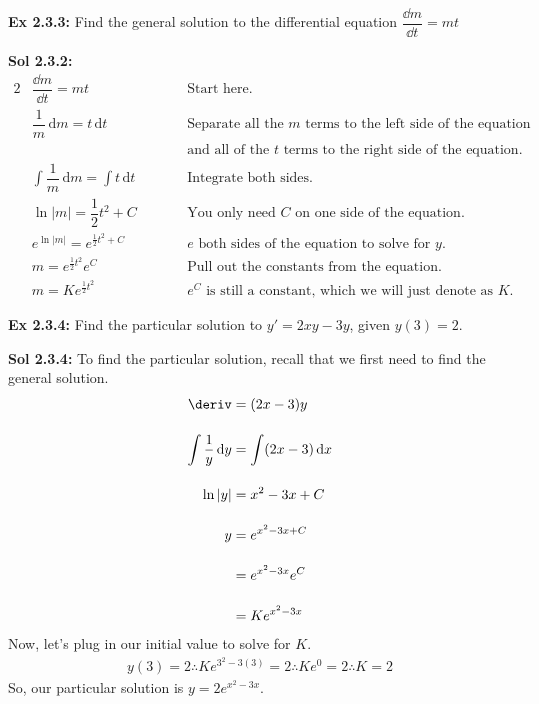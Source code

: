 \begin{tcolorbox}[example]
    \textbf{Ex 2.3.3: } Find the general solution to the differential equation $\dfrac{\dd m}{\dd t} = mt$
\end{tcolorbox}
\begin{tcolorbox}[solution]
    \textbf{Sol 2.3.2: } \vspace{11pt} \begin{alignat*}{2}
        & \dfrac{\dd m}{\dd t} = mt &\qquad& \text{Start here.} \\[11pt]
        & \dfrac{1}{m} \,\mathrm{d}m = t \,\mathrm{d}t &\qquad& \text{Separate all the $m$ terms to the left side of the equation} \\
        & &\qquad& \text{and all of the $t$ terms to the right side of the equation.} \\[11pt]
        & \int \dfrac{1}{m} \,\mathrm{d}m = \int t \,\mathrm{d}t &\qquad& \text{Integrate both sides.} \\[11pt]
        & \ln |m| = \dfrac{1}{2}t^2 + C &\qquad& \text{You only need $C$ on one side of the equation.} \\[11pt]
        & e^{\ln |m|} = e^{\frac{1}{2}t^2 + C} &\qquad& \text{$e$ both sides of the equation to solve for $y$.} \\[11pt]
        & m = e^{\frac{1}{2}t^2}e^C &\qquad& \text{Pull out the constants from the equation.} \\[11pt]
        & m = Ke^{\frac{1}{2}t^2} &\qquad& \text{$e^C$ is still a constant, which we will just denote as $K$.}
    \end{alignat*}
\end{tcolorbox} \vspace{11pt}

\begin{tcolorbox}[example]
    \textbf{Ex 2.3.4: } Find the particular solution to $y' = 2xy - 3y$, given $y(3) = 2$.
\end{tcolorbox}
\begin{tcolorbox}[solution]
    \textbf{Sol 2.3.4: } To find the particular solution, recall that we first need to find the general solution. \begin{align*}
        \deriv &= (2x - 3)y \\[11pt]
        \int \dfrac{1}{y} \,\mathrm{d}y &= \int (2x - 3) \,\mathrm{d}x \\[11pt]
        \ln |y| &= x^2 - 3x + C \\[11pt]
        y &\begin{aligned}[t]
            & = e^{x^2 - 3x + C} \\[11pt]
            & = e^{x^2 - 3x}e^C \\[11pt]
            & = Ke^{x^2 - 3x}
        \end{aligned}
    \end{align*}
    Now, let's plug in our initial value to solve for $K$. \begin{align*}
        y(3) = 2 \therefore Ke^{3^2 - 3(3)} = 2 \therefore Ke^0 = 2 \therefore K = 2
    \end{align*}
    So, our particular solution is $\boxed{y = 2e^{x^2 - 3x}}$.
\end{tcolorbox} \vspace{11pt}

